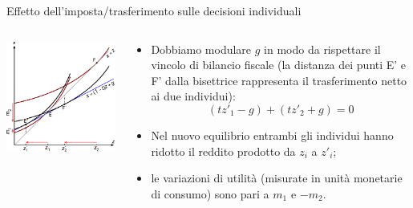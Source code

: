 \documentclass[aspectratio=64,12pt]{beamer}
\begin{document}
\begin{frame}{Effetto dell'imposta/trasferimento sulle decisioni individuali}
\begin{columns}[T]
\begin{column}{.55\columnwidth}
\begin{center}
\includegraphics[scale=.9]{./figure/effetto-distorsivo-imposte-ql-color-3.pdf}
\end{center}
\end{column}


\begin{column}{.45\columnwidth}
\begin{itemize}
\item Dobbiamo modulare $g$ in modo da rispettare il vincolo di bilancio
fiscale (la distanza dei punti E' e F' dalla bisettrice rappresenta il
trasferimento netto ai due individui):
$$ (tz'_1-g)+(tz'_2+g)=0 $$
\item Nel nuovo equilibrio entrambi gli individui hanno ridotto il reddito
  prodotto da $z_i$ a $z'_i$;
\item le variazioni di utilità (misurate in unità monetarie di consumo) sono pari a $m_1$ e $-m_2$.
\end{itemize}
\end{column}
\end{columns}
\end{frame}
\end{document}
